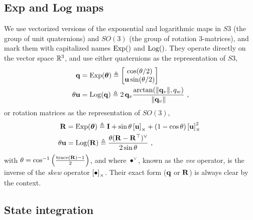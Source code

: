\subsection{Exp and Log maps}

We use vectorized versions of the exponential and logarithmic maps in $S3$ (the group of unit quaternions) and $SO(3)$ (the group of rotation 3-matrices), and mark them with capitalized names $\operatorname*{Exp}()$ and $\operatorname*{Log}()$. They operate directly on the vector space ${\mathbb R}^3$, and use either quaternions as the representation of $S3$,
%
\begin{subequations}
\begin{align}
{\bf q}
&= \operatorname*{Exp}({{\bm \theta}}) \triangleq \begin{bmatrix}
\cos(\theta/2) \\ {\bf u}\sin(\theta/2)
\end{bmatrix}\\ 
\theta{\bf u} &= \operatorname*{Log}({\bf q}) \triangleq 2\,{{\bf q}_v}\frac{\arctan({{\left\|{{\bf q}_v}\right\|},q_w})}{{\left\|{{\bf q}_v}\right\|}}
~,
\end{align}
\end{subequations}
%
or rotation matrices as the representation of $SO(3)$, 
%
\begin{subequations}
\begin{align}
{\bf R}
&= \operatorname*{Exp}({{\bm \theta}}) \triangleq {\bf I} + \sin\theta\left[{\bf u}\right]_\times + (1-\cos\theta)\left[{\bf u}\right]_\times^2~ \label{equ:rodrigues} \\ 
\theta{\bf u} &= \operatorname*{Log}({\bf R}) \triangleq \frac{\theta({\bf R}-{\bf R}^{\top})^\vee}{2\sin\theta} 
~,
\end{align}
\end{subequations}
%
with $\theta=\cos^{-1}\left(\frac{\operatorname*{trace}({\bf R})-1}{2}\right)$,
and where $\bullet^\vee$, known as the \emph{vee} operator, is the inverse of the \emph{skew} operator $\left[\bullet\right]_\times$. 
Their exact form (${\bf q}$ or ${\bf R}$) is always clear by the context.





\subsection{State integration}

